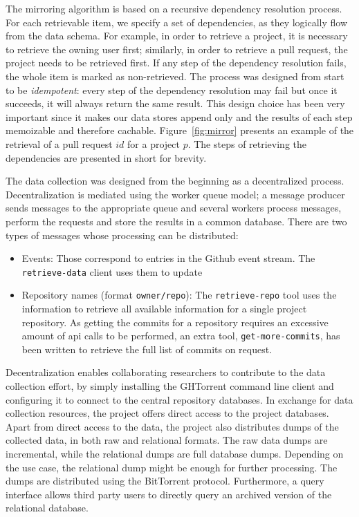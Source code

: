 \documentclass[conference]{IEEEtran}
\begin{document}
The mirroring algorithm is based on a recursive dependency resolution process.
For each retrievable item, we specify a set of dependencies, as they logically
flow from the data schema. For example, in order to retrieve a \textsf{project},
it is necessary to retrieve the owning \textsf{user} first; similarly, in order
to retrieve a pull request, the \textsf{project} needs to be retrieved first. If
any step of the dependency resolution fails, the whole item is marked as
non-retrieved.  The process was designed from start to be \emph{idempotent}:
every step of the dependency resolution may fail but once it succeeds, it will
always return the same result. This design choice has been very important since
it makes our data stores append only and the results of each step memoizable and
therefore cachable. Figure~\ref{fig:mirror} presents an example of the retrieval
of a pull request $id$ for a project $p$.  The steps of retrieving the
dependencies are presented in short for brevity.

The data collection was designed from the beginning as a decentralized process.
Decentralization is mediated using the worker queue model; a message producer
sends messages to the appropriate queue and several workers process messages,
perform the requests and store the results in a common database. There are two
types of messages whose processing can be distributed:

\begin{itemize}

  \item Events: Those correspond to entries in the Github event stream. The
    \texttt{retrieve-data} client uses them to update

  \item Repository names (format \texttt{owner/repo}): The
    \texttt{retrieve-repo} tool uses the information to retrieve all available
    information for a single project repository. As getting the commits for a
    repository requires an excessive amount of {\sc api} calls to be performed,
    an extra tool, \texttt{get-more-commits}, has been written to retrieve the
    full list of commits on request. 

\end{itemize}

Decentralization enables collaborating researchers to contribute to the data
collection effort, by simply installing the GHTorrent command line client and
configuring it to connect to the central repository databases. In exchange for
data collection resources, the project offers direct access to the project
databases. Apart from direct access to the data, the project also distributes
dumps of the collected data, in both raw and relational formats. The raw data
dumps are incremental, while the relational dumps are full database dumps.
Depending on the use case, the relational dump might be enough for further
processing.  The dumps are distributed using the BitTorrent protocol.
Furthermore, a query interface allows third party users to directly query an
archived version of the relational database.
\end{document}
